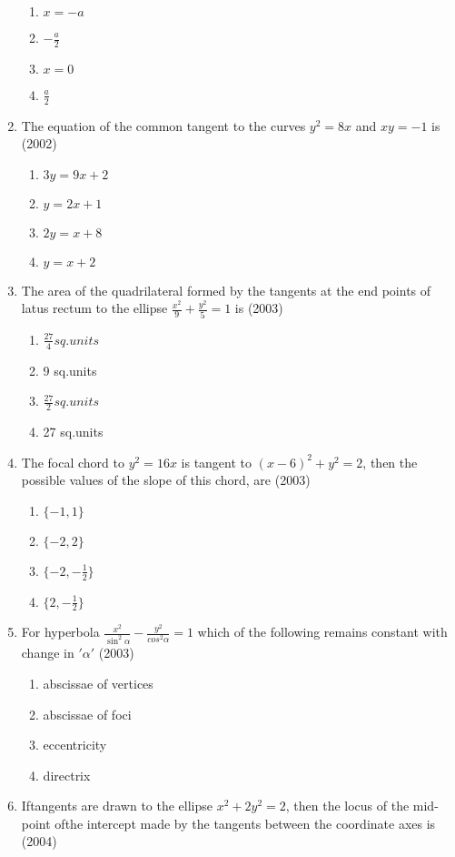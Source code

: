 \documentclass[12pt]{article}
\begin{document}
\begin{enumerate}
\begin{enumerate}
\item $x=-a$
\item $-\frac{a}{2}$
\item $x=0$
\item $\frac{a}{2}$
\end{enumerate}
\item The equation of the common tangent to the curves $y^2=8x$ and $xy=-1$ is (2002)
\begin{enumerate}
\item $3y=9x+2$
\item $y=2x+1$
\item $2y=x+8$
\item $y=x+2$
\end{enumerate}
\item The area of the quadrilateral formed by the tangents at the end points of latus rectum to the ellipse $\frac{x^2}{9}+\frac{y^2}{5}=1$ is  (2003)
\begin{enumerate}
\item $\frac{27}{4}sq.units$
\item 9 sq.units
\item $\frac{27}{2}sq.units$
\item 27 sq.units 
\end{enumerate}
\item The focal chord to $y^2=16x$ is tangent to $(x-6)^2+y^2=2$, then the possible values of the slope of this chord, are (2003)
\begin{enumerate}
\item $\{-1,1\}$
\item $\{-2,2\}$
\item $\{-2,-\frac{1}{2}\}$
\item $\{2,-\frac{1}{2}\}$
\end{enumerate}
\item For hyperbola $\frac{x^2}{\sin^2\alpha}-\frac{y^2}{cos^2\alpha}=1$  which of the following remains constant with change in $'\alpha'$ (2003)
\begin{enumerate}
\item abscissae of vertices
\item abscissae of foci
\item eccentricity
\item directrix
\end{enumerate}
\item Iftangents are drawn to the ellipse $x^2+2y^2=2$, then the locus of the mid-point ofthe intercept made by the tangents between the coordinate axes is (2004)

\end{enumerate}
\end{document}
